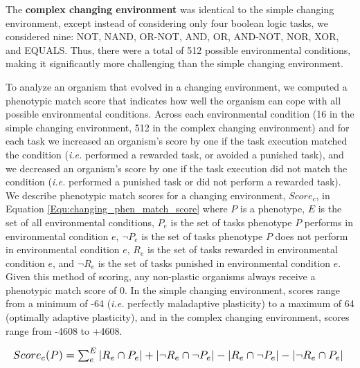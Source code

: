 The \textbf{complex changing environment} was identical to the simple changing environment, except instead of considering only four boolean logic tasks, we considered nine: NOT, NAND, OR-NOT, AND, OR, AND-NOT, NOR, XOR, and EQUALS. Thus, there were a total of 512 possible environmental conditions, making it %
significantly more challenging than the simple changing environment.

%
%
To analyze an organism that evolved in a changing environment, we computed a phenotypic match score that indicates how well the organism can cope with all possible environmental conditions.  Across each environmental condition (16 in the simple changing environment, 512 in the complex changing environment) and for each task we increased an organism's score by one if the task execution matched the condition (\textit{i.e.} performed a rewarded task, or avoided a punished task), and we decreased an organism's score by one if the task execution did not match the condition (\textit{i.e.} performed a punished task or did not perform a rewarded task). We describe phenotypic match scores for a changing environment, $Score_c$, in Equation \ref{Equ:changing_phen_match_score} where $P$ is a phenotype, $E$ is the set of all environmental conditions, $P_e$ is the set of tasks phenotype $P$ performs in environmental condition $e$, $\neg P_e$ is the set of tasks phenotype $P$ does not perform in environmental condition $e$, $R_e$ is the set of tasks rewarded in environmental condition $e$, and $\neg R_e$ is the set of tasks punished in environmental condition $e$. Given this method of scoring, any non-plastic organisms always receive a phenotypic match score of 0. In the simple changing environment, scores range from a minimum of -64 (\textit{i.e.} perfectly maladaptive plasticity) to a maximum of 64 (optimally adaptive plasticity), and in the complex changing environment, scores range from -4608 to +4608.


\begin{equation}
\resizebox{\columnwidth}{!}{$
Score_c(P) = \sum_{e}^{E}|R_e \cap P_e|+|\neg R_e \cap \neg P_e|-|R_e \cap \neg P_e|-|\neg R_e \cap P_e|$
}
\label{Equ:changing_phen_match_score}
\end{equation}

